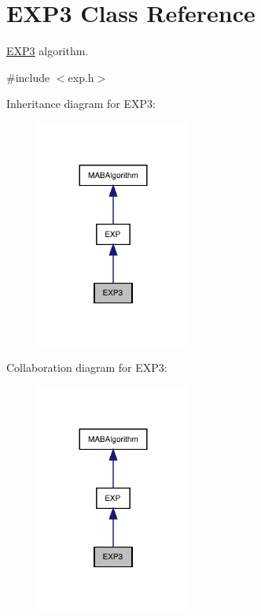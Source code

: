 \hypertarget{class_e_x_p3}{}\section{E\+X\+P3 Class Reference}
\label{class_e_x_p3}


\mbox{\hyperlink{class_e_x_p3}{E\+X\+P3}} algorithm.  




{\ttfamily \#include $<$exp.\+h$>$}



Inheritance diagram for E\+X\+P3\+:
\nopagebreak
\begin{figure}[H]
\begin{center}
\leavevmode
\includegraphics[width=144pt]{class_e_x_p3__inherit__graph}
\end{center}
\end{figure}


Collaboration diagram for E\+X\+P3\+:
\nopagebreak
\begin{figure}[H]
\begin{center}
\leavevmode
\includegraphics[width=144pt]{class_e_x_p3__coll__graph}
\end{center}
\end{figure}
